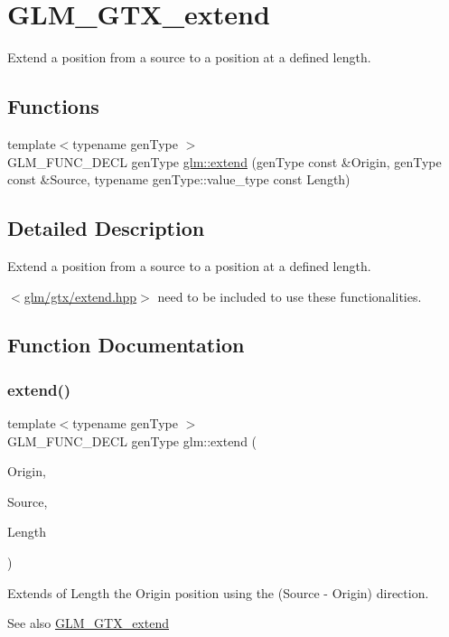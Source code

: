 \hypertarget{group__gtx__extend}{}\section{G\+L\+M\+\_\+\+G\+T\+X\+\_\+extend}
\label{group__gtx__extend}


Extend a position from a source to a position at a defined length.  


\subsection*{Functions}
\begin{DoxyCompactItemize}
\item 
{\footnotesize template$<$typename gen\+Type $>$ }\\G\+L\+M\+\_\+\+F\+U\+N\+C\+\_\+\+D\+E\+CL gen\+Type \hyperlink{group__gtx__extend_ga8140caae613b0f847ab0d7175dc03a37}{glm\+::extend} (gen\+Type const \&Origin, gen\+Type const \&Source, typename gen\+Type\+::value\+\_\+type const Length)
\end{DoxyCompactItemize}


\subsection{Detailed Description}
Extend a position from a source to a position at a defined length. 

$<$\hyperlink{extend_8hpp}{glm/gtx/extend.\+hpp}$>$ need to be included to use these functionalities. 

\subsection{Function Documentation}
\mbox{\label{group__gtx__extend_ga8140caae613b0f847ab0d7175dc03a37}} 
\subsubsection{\texorpdfstring{extend()}{extend()}}
{\footnotesize\ttfamily template$<$typename gen\+Type $>$ \\
G\+L\+M\+\_\+\+F\+U\+N\+C\+\_\+\+D\+E\+CL gen\+Type glm\+::extend (\begin{DoxyParamCaption}\item[{gen\+Type const \&}]{Origin,  }\item[{gen\+Type const \&}]{Source,  }\item[{typename gen\+Type\+::value\+\_\+type const}]{Length }\end{DoxyParamCaption})}

Extends of Length the Origin position using the (Source -\/ Origin) direction. \begin{DoxySeeAlso}{See also}
\hyperlink{group__gtx__extend}{G\+L\+M\+\_\+\+G\+T\+X\+\_\+extend} 
\end{DoxySeeAlso}
